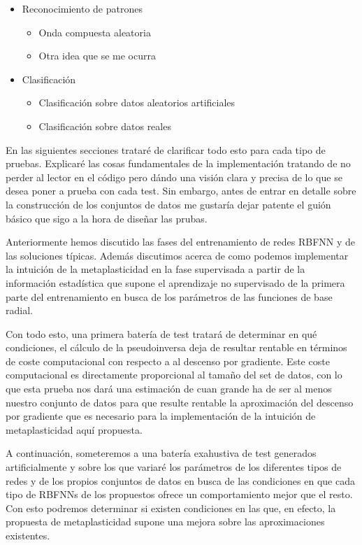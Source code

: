 \documentclass[10pt,a4paper, twocolumn]{report}
\begin{document}
\begin{itemize}
	\item Reconocimiento de patrones
	\begin{itemize}
		\item Onda compuesta aleatoria
		\item Otra idea que se me ocurra
	\end{itemize}
	\item Clasificación
	\begin{itemize}
		\item Clasificación sobre datos aleatorios artificiales
		\item Clasificación sobre datos reales
	\end{itemize}
\end{itemize} 
En las siguientes secciones trataré de clarificar todo esto para cada tipo de pruebas. Explicaré las cosas fundamentales de la implementación tratando de no perder al lector en el código pero dándo una visión clara y precisa de lo que se desea poner a prueba con cada test. Sin embargo, antes de entrar en detalle sobre la construcción de los conjuntos de datos me gustaría dejar patente el guión básico que sigo a la hora de diseñar las prubas.

Anteriormente hemos discutido las fases del entrenamiento de redes RBFNN y de las soluciones típicas. Además discutimos acerca de como podemos implementar la intuición de la metaplasticidad en la fase supervisada a partir de la información estadística que supone el aprendizaje no supervisado de la primera parte del entrenamiento en busca de los parámetros de las funciones de base radial. 

Con todo esto, una primera batería de test tratará de determinar en qué condiciones, el cálculo de la pseudoinversa deja de resultar rentable en términos de coste computacional con respecto a al descenso por gradiente. Este coste computacional es directamente proporcional al tamaño del set de datos, con lo que esta prueba nos dará una estimación de cuan grande ha de ser al menos nuestro conjunto de datos para que resulte rentable la aproximación del descenso por gradiente que es necesario para la implementación de la intuición de metaplasticidad aquí propuesta.

A continuación, someteremos a una batería exahustiva de test generados artificialmente y sobre los que variaré los parámetros de los diferentes tipos de redes y de los propios conjuntos de datos en busca de las condiciones en que cada tipo de RBFNNs de los propuestos ofrece un comportamiento mejor que el resto. Con esto podremos determinar si existen condiciones en las que, en efecto, la propuesta de metaplasticidad supone una mejora sobre las aproximaciones existentes.
\end{document}
